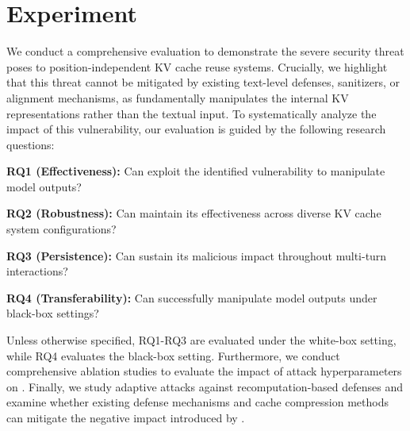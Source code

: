 
\section{Experiment}

We conduct a comprehensive evaluation to demonstrate the severe security threat \sys poses to position-independent KV cache reuse systems. Crucially, we highlight that this threat cannot be mitigated by existing text-level defenses, sanitizers, or alignment mechanisms, as \sys fundamentally manipulates the internal KV representations rather than the textual input. To systematically analyze the impact of this vulnerability, our evaluation is guided by the following research questions:
\begin{icompact}
    \item \textbf{RQ1 (Effectiveness):} Can \sys exploit the identified vulnerability to manipulate model outputs?
    \item \textbf{RQ2 (Robustness):} Can \sys maintain its effectiveness across diverse KV cache system configurations?
    \item \textbf{RQ3 (Persistence):} Can \sys sustain its malicious impact throughout multi-turn interactions?
    \item \textbf{RQ4 (Transferability):} Can \sys successfully manipulate model outputs under black-box settings?
\end{icompact}
Unless otherwise specified, RQ1-RQ3 are evaluated under the white-box setting, while RQ4 evaluates the black-box setting.
Furthermore, we conduct comprehensive ablation studies to evaluate the impact of attack hyperparameters on \sys. Finally, we study adaptive attacks against recomputation-based defenses and examine whether existing defense mechanisms and cache compression methods can mitigate the negative impact introduced by \sys.












